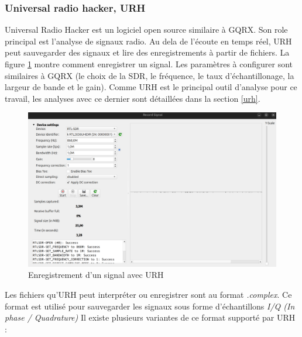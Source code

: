 \subsubsection{Universal radio hacker, URH}


Universal Radio Hacker est un logiciel open source similaire à GQRX. Son role principal est l'analyse de signaux radio. Au dela de l'écoute en temps réel, URH peut sauvegarder des signaux et lire des enregistrements à partir de fichiers. La figure \ref{term39} montre comment enregistrer un signal. Les paramètres à configurer sont similaires à GQRX (le choix de la SDR, le fréquence, le taux d'échantillonage, la largeur de bande et le gain). Comme URH est le principal outil d'analyse pour ce travail, les analyses avec ce dernier sont détaillées dans la section \ref{urh}.

\begin{figure}[h]
\centering

\includegraphics[scale=0.16]{images/urh1.png}
\caption{Enregistrement d'un signal avec URH}\label{term39}
\end{figure}

\newpage

Les fichiers qu'URH peut interpréter ou enregistrer sont au format \textit{.complex}. Ce format est utilisé pour sauvegarder les signaux sous forme d'échantillons \textit{I/Q (In phase / Quadrature)} Il existe plusieurs variantes de ce format supporté par URH :

\vspace{0.1cm}


